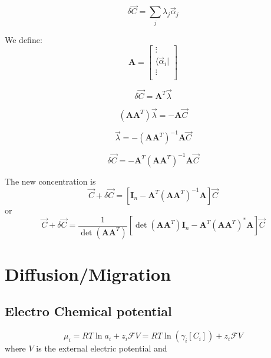 \documentclass[aps,12pt]{revtex4}
\begin{document}
\begin{equation}
	\delta \vec C = \sum_j \lambda_j \vec \alpha_j
\end{equation}

We define:
\begin{equation}
	\bm{A} =  
    \begin{bmatrix}
	\vdots\\
	\langle \vec \alpha_i \vert\\
	\vdots\\
	\end{bmatrix}
 \end{equation}

\begin{equation}
	\delta \vec C = \bm{A}^T \vec\lambda
\end{equation}

\begin{equation}
	\left(\bm{A}\bm{A}^T\right) \vec\lambda = - \bm{A} \vec{C}
\end{equation}

\begin{equation}
	\vec\lambda  = - \left(\bm{A}\bm{A}^T\right)^{-1} \bm{A} \vec{C}
\end{equation}

\begin{equation}
	\delta	\vec C = - \bm{A}^T \left(\bm{A}\bm{A}^T\right)^{-1} \bm{A} \vec{C}
\end{equation}

The new concentration is
\begin{equation}
	\vec C + \delta \vec C = \left[\bm{I}_n - \bm{A}^T \left(\bm{A}\bm{A}^T\right)^{-1} \bm{A}\right] \vec{C}
\end{equation}
or
\begin{equation}
	\vec C + \delta \vec C = \dfrac{1}{\det\left(\bm{A}\bm{A}^T\right)}
	\left[ \det\left(\bm{A}\bm{A}^T\right) \bm{I}_n - \bm{A}^T \left(\bm{A}\bm{A}^T\right)^\ast \bm{A}\right] \vec{C}
\end{equation}

\section{Diffusion/Migration}

\subsection{Electro Chemical potential}

\begin{equation}
	\mu_i = RT \ln a_i + z_i \mathcal{F} V = RT \ln (\gamma_i[C_i]) + z_i \mathcal{F} V
\end{equation}
where $V$ is the external electric potential and
\end{document}
